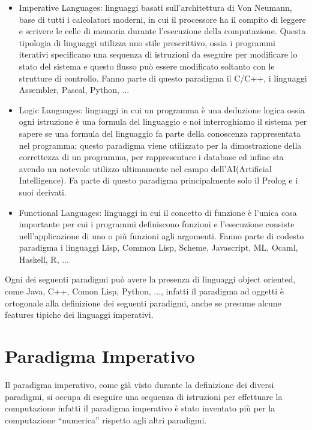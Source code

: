 \documentclass[a4paper]{report}
\begin{document}
\begin{itemize}
\item Imperative Languages: linguaggi basati sull'architettura di Von Neumann, base di tutti i calcolatori moderni,
      in cui il processore ha il compito di leggere e scrivere le celle di memoria durante l'esecuzione della computazione.\newline
      Questa tipologia di linguaggi utilizza uno stile prescrittivo, ossia i programmi iterativi specificano una sequenza
      di istruzioni da eseguire per modificare lo stato del sistema e questo flusso può essere modificato soltanto con
      le strutture di controllo.\newline
      Fanno parte di questo paradigma il C/C++, i linguaggi Assembler, Pascal, Python, ...
\item Logic Languages: linguaggi in cui un programma è una deduzione logica ossia ogni istruzione è una formula del linguaggio
      e noi interroghiamo il sistema per sapere se una formula del linguaggio fa parte della conoscenza rappresentata nel programma;
      questo paradigma viene utilizzato per la dimostrazione della correttezza di un programma, per rappresentare i database
      ed infine sta avendo un notevole utilizzo ultimamente nel campo dell'AI(Artificial Intelligence).\newline
      Fa parte di questo paradigma principalmente solo il Prolog e i suoi derivati.
\item Functional Languages: linguaggi in cui il concetto di funzione è l'unica cosa importante per cui i programmi definiscono
      funzioni e l'esecuzione consiste nell'applicazione di uno o più funzioni agli argomenti.\newline
      Fanno parte di codesto paradigma i linguaggi Lisp, Common Lisp, Scheme, Javascript, ML, Ocaml, Haskell, R, ...
\end{itemize}
Ogni dei seguenti paradigmi può avere la presenza di linguaggi object oriented, come Java, C++, Comon Lisp, Python, ...,
infatti il paradigma ad oggetti è ortogonale alla definizione dei seguenti paradigmi, anche se presume alcune features tipiche
dei linguaggi imperativi.

\section{Paradigma Imperativo}
Il paradigma imperativo, come già visto durante la definizione dei diversi paradigmi, si occupa di eseguire una sequenza di istruzioni
per effettuare la computazione infatti il paradigma imperativo è stato inventato più per la computazione ``numerica'' rispetto agli
altri paradigmi.
\end{document}
